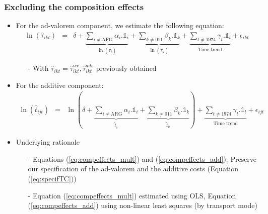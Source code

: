 \documentclass[10 pt,Helvetica, french]{beamer}
\begin{document}
\begin{frame}
\frametitle{Excluding the composition effects}
\begin{itemize}
\item For the ad-valorem component, we estimate the following equation:
\footnotesize
\begin{eqnarray}
\ln(\widehat{\tau}_{ikt})&=&\delta +\underbrace{\sum_{i \neq \text{AFG}}\alpha_i.\mathbb{1}_i }_{\ln(\widetilde{\tau}_i)}+ \underbrace{\sum_{k\neq \text{011}}\beta_k.\mathbb{1}_k }_{\ln(\widetilde{\tau}_k)}+ \underbrace{\sum_{t \neq 1974}\gamma_t.\mathbb{1}_t}_{\text{Time trend}}+\epsilon_{ikt} \label{eq:compeffects_mult}
\end{eqnarray}
\normalsize
\begin{itemize}
\item[-] With $\widehat{\tau}_{ikt} = \widehat{\tau}^{ice}_{ikt}, \widehat{\tau}^{adv}_{ikt}$ previously obtained  \vspace{0.1cm}
\end{itemize}
\item For the additive component:
\footnotesize
\begin{eqnarray}
\ln(\widehat{t}_{ijt})&=&\ln\left(\delta +  \underbrace{\sum_{i \neq \text{ARG}}  \alpha_i.\mathbb{1}_i}_{\widetilde{t}_i}+ \underbrace{\sum_{k \neq \text{011}}\beta_k.\mathbb{1}_k}_{\widetilde{t}_k}\right) + \underbrace{\sum_{t \neq 1974}\gamma_t.\mathbb{1}_t}_{\text{Time trend}}+\epsilon_{ijt} \label{eq:compeffects_add}
\end{eqnarray}
\normalsize
\item Underlying rationale 
\footnotesize
\begin{itemize}
\item[-] Equations (\ref{eq:compeffects_mult}) and (\ref{eq:compeffects_add}): Preserve our specification of the ad-valorem and the additive costs (Equation (\ref{eq:specifTC})) \vspace{0.1cm}
\item[-] Equation (\ref{eq:compeffects_mult}) estimated using OLS, Equation (\ref{eq:compeffects_add}) using non-linear least squares (by transport mode)
    \normalsize
\end{itemize}
\end{itemize}
\end{frame}
\end{document}
